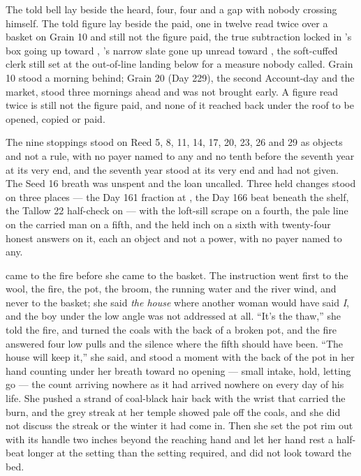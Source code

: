 The told bell lay beside the heard, four, four and a gap with nobody crossing himself. The told figure lay beside the paid, one in twelve read twice over a basket on Grain 10 and still not the figure paid, the true subtraction locked in 's box going up toward , 's narrow slate gone up unread toward , the soft-cuffed clerk still set at the out-of-line landing below  for a measure nobody called. Grain 10 stood a morning behind; Grain 20 (Day 229), the second Account-day and the market, stood three mornings ahead and was not brought early. A figure read twice is still not the figure paid, and none of it reached back under the roof to be opened, copied or paid.

The nine stoppings stood on Reed 5, 8, 11, 14, 17, 20, 23, 26 and 29 as objects and not a rule, with no payer named to any and no tenth before the seventh year at its very end, and the seventh year stood at its very end and had not given. The Seed 16 breath was unspent and the loan uncalled. Three held changes stood on three places --- the Day 161 fraction at , the Day 166 beat beneath the shelf, the Tallow 22 half-check on  --- with the loft-sill scrape on a fourth, the pale line on the carried man on a fifth, and the held inch on a sixth with twenty-four honest answers on it, each an object and not a power, with no payer named to any.

\scenebreak

 came to the fire before she came to the basket. The instruction went first to the wool, the fire, the pot, the broom, the running water and the river wind, and never to the basket; she said \emph{the house} where another woman would have said \emph{I}, and the boy under the low angle was not addressed at all. “It's the thaw,” she told the fire, and turned the coals with the back of a broken pot, and the fire answered four low pulls and the silence where the fifth should have been. “The house will keep it,” she said, and stood a moment with the back of the pot in her hand counting under her breath toward no opening --- small intake, hold, letting go --- the count arriving nowhere as it had arrived nowhere on every day of his life. She pushed a strand of coal-black hair back with the wrist that carried the burn, and the grey streak at her temple showed pale off the coals, and she did not discuss the streak or the winter it had come in. Then she set the pot rim out with its handle two inches beyond the reaching hand and let her hand rest a half-beat longer at the setting than the setting required, and did not look toward the bed.

